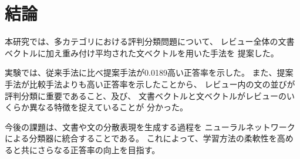 \documentclass{ttisummary}
\begin{document}
%



\section{結論}

本研究では、多カテゴリにおける評判分類問題について、
レビュー全体の文書ベクトルに加え重み付け平均された文ベクトルを用いた手法を
提案した。

実験では、従来手法\cite{fujitani15}に比べ提案手法が0.0189高い正答率を示した。
また、提案手法が比較手法よりも高い正答率を示したことから、
レビュー内の文の並びが評判分類に重要であること、及び、
文書ベクトルと文ベクトルがレビューのいくらか異なる特徴を捉えていることが
分かった。

今後の課題は、文書や文の分散表現を生成する過程を
ニューラルネットワークによる分類器に統合することである。
これによって、学習方法の柔軟性を高めると共にさらなる正答率の向上を目指す。
\end{document}
